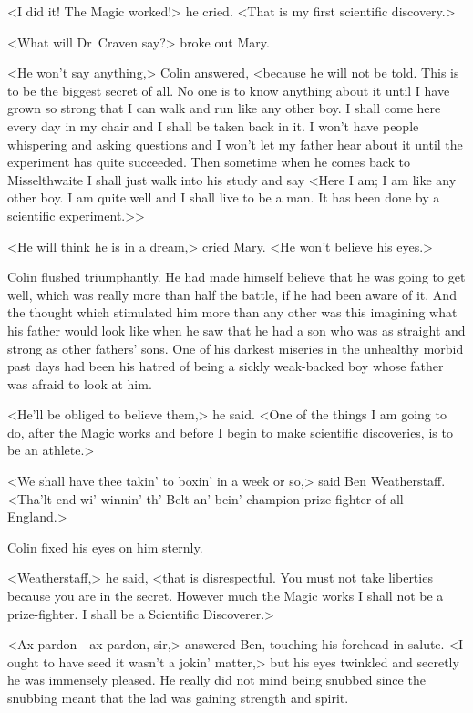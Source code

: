 <I did it! The Magic worked!> he cried. <That is my first scientific discovery.>

<What will Dr~Craven say?> broke out Mary.

<He won't say anything,> Colin answered, <because he will not be told. This is to be the biggest secret of all. No one is to know anything about it until I have grown so strong that I can walk and run like any other boy. I shall come here every day in my chair and I shall be taken back in it. I won't have people whispering and asking questions and I won't let my father hear about it until the experiment has quite succeeded. Then sometime when he comes back to Misselthwaite I shall just walk into his study and say <Here I am; I am like any other boy. I am quite well and I shall live to be a man. It has been done by a scientific experiment.>>

<He will think he is in a dream,> cried Mary. <He won't believe his eyes.>

Colin flushed triumphantly. He had made himself believe that he was going to get well, which was really more than half the battle, if he had been aware of it. And the thought which stimulated him more than any other was this imagining what his father would look like when he saw that he had a son who was as straight and strong as other fathers' sons. One of his darkest miseries in the unhealthy morbid past days had been his hatred of being a sickly weak-backed boy whose father was afraid to look at him.

<He'll be obliged to believe them,> he said. <One of the things I am going to do, after the Magic works and before I begin to make scientific discoveries, is to be an athlete.>

<We shall have thee takin' to boxin' in a week or so,> said Ben Weatherstaff. <Tha'lt end wi' winnin' th' Belt an' bein' champion prize-fighter of all England.>

Colin fixed his eyes on him sternly.

<Weatherstaff,> he said, <that is disrespectful. You must not take liberties because you are in the secret. However much the Magic works I shall not be a prize-fighter. I shall be a Scientific Discoverer.>

<Ax pardon—ax pardon, sir,> answered Ben, touching his forehead in salute. <I ought to have seed it wasn't a jokin' matter,> but his eyes twinkled and secretly he was immensely pleased. He really did not mind being snubbed since the snubbing meant that the lad was gaining strength and spirit.